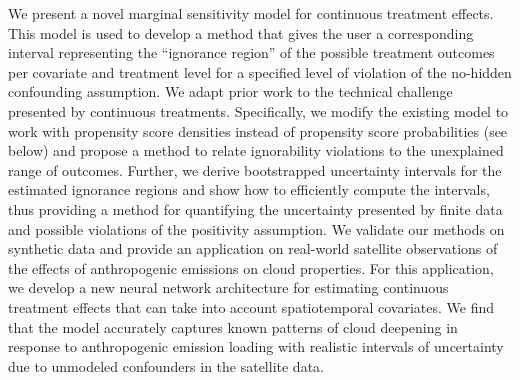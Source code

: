 We present a novel marginal sensitivity model for continuous treatment effects. 
This model is used to develop a method that gives the user a corresponding interval representing the ``ignorance region'' of the possible treatment outcomes per covariate and treatment level \citep{d2019multi} for a specified level of violation of the no-hidden confounding assumption. 
We adapt prior work \citep{tan2006msm,kallus2019interval,jesson2021quantifying} to the technical challenge presented by continuous treatments. 
Specifically, we modify the existing model to work with propensity score densities instead of propensity score probabilities (see  below) and propose a method to relate ignorability violations to the unexplained range of outcomes.
Further, we derive bootstrapped uncertainty intervals for the estimated ignorance regions and show how to efficiently compute the intervals, thus providing a method for quantifying the uncertainty presented by finite data and possible violations of the positivity assumption. 
We validate our methods on synthetic data and provide an application on real-world satellite observations of the effects of anthropogenic emissions on cloud properties. 
For this application, we develop a new neural network architecture for estimating continuous treatment effects that can take into account spatiotemporal covariates. 
We find that the model accurately captures known patterns of cloud deepening in response to anthropogenic emission loading with realistic intervals of uncertainty due to unmodeled confounders in the satellite data.
